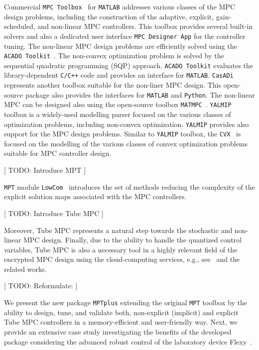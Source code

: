 \documentclass[letterpaper, 10 pt, conference]{ieeeconf}
\begin{document}
Commercial \texttt{MPC Toolbox}~\cite{MPC_toolbox} for \texttt{MATLAB} addresses various classes of the MPC design problems, including the construction of the adaptive, explicit, gain-scheduled, and non-linear MPC controllers. This toolbox provides several built-in solvers and also a dedicated user interface \texttt{MPC Designer App} for the controller tuning. 
%
The non-linear MPC design problems are efficiently solved using the \texttt{ACADO Toolkit}~\cite{ACADO_Toolkit}. The non-convex optimization problem is solved by the sequential quadratic programming (SQP) approach.  \texttt{ACADO Toolkit} evaluates the library-dependent \texttt{C/C++} code and provides an interface for \texttt{MATLAB}. 
%
\texttt{CasADi}~\cite{CasADi} represents another toolbox suitable for the non-liner MPC design. This open-source package also provides the interfaces for \texttt{MATLAB} and \texttt{Python}. 
%
The non-linear MPC can be designed also using the open-source toolbox \texttt{MATMPC}~\cite{MATMPC}. 
%
\texttt{YALMIP}~\cite{L04} toolbox is a widely-used modelling parser focused on the various classes of optimization problems, including non-convex optimization. \texttt{YALMIP} provides also support for the MPC design problems. 
%
Similar to \texttt{YALMIP} toolbox, the \texttt{CVX}~\cite{GB08} is focused on the modelling of the various classes of convex optimization problems suitable for MPC controller design. 

[ TODO: Introduce MPT ]

\texttt{MPT} module \texttt{LowCom}~\cite{KH15} introduces the set of methods reducing the complexity of the explicit solution maps associated with the MPC controllers.

[ TODO: Introduce Tube MPC ]

Moreover, Tube MPC represents a natural step towards the stochastic and non-linear MPC design. Finally, due to the ability to handle the quantized control variables, Tube MPC is also a necessary tool in a highly relevant field of the encrypted MPC design using the cloud-computing services, e.g., see~\cite{DR18} and the related works.

[ TODO: Reformulate: ]

We present the new package \texttt{MPTplus} extending the original \texttt{MPT} toolbox by the ability to design, tune, and validate both, non-explicit (implicit) and explicit Tube MPC controllers in a memory-efficient and user-friendly way.
Next, we provide an extensive case study investigating the benefits of the developed package considering the advanced robust control of the laboratory device Flexy~\cite{CK19}. 
\end{document}
